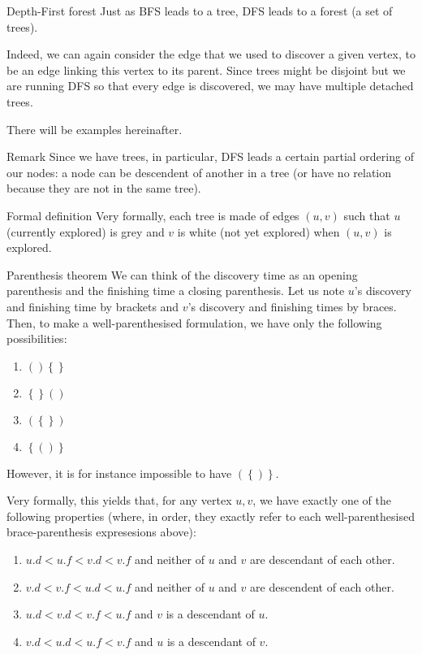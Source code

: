 \documentclass[a4paper]{article}
\begin{document}
\begin{parag}{Depth-First forest}
    Just as BFS leads to a tree, DFS leads to a forest (a set of trees). 

    Indeed, we can again consider the edge that we used to discover a given vertex, to be an edge linking this vertex to its parent. Since trees might be disjoint but we are running DFS so that every edge is discovered, we may have multiple detached trees.

    There will be examples hereinafter.

    \begin{subparag}{Remark}
        Since we have trees, in particular, DFS leads a certain partial ordering of our nodes: a node can be descendent of another in a tree (or have no relation because they are not in the same tree).
    \end{subparag}

    \begin{subparag}{Formal definition}
        Very formally, each tree is made of edges $\left(u, v\right)$ such that $u$ (currently explored) is grey and $v$ is white (not yet explored) when $\left(u, v\right)$ is explored.
    \end{subparag}
\end{parag}


\begin{parag}{Parenthesis theorem}
    We can think of the discovery time as an opening parenthesis and the finishing time a closing parenthesis. Let us note $u$'s discovery and finishing time by brackets and $v$'s discovery and finishing times by braces. Then, to make a well-parenthesised formulation, we have only the following possibilities:
    \begin{enumerate}
        \item $\left(\right)\left\{\right\}$
        \item $\left\{\right\}\left(\right)$
        \item $\left(\left\{\right\}\right)$
        \item $\left\{\left(\right)\right\}$
    \end{enumerate}
    
    However, it is for instance impossible to have $\left(\left\{\right)\right\}$.

    Very formally, this yields that, for any vertex $u, v$, we have exactly one of the following properties (where, in order, they exactly refer to each well-parenthesised brace-parenthesis expresesions above):
    \begin{enumerate}
        \item $u.d < u.f < v.d < v.f$ and neither of $u$ and $v$ are descendant of each other.
        \item $v.d < v.f < u.d < u.f$ and neither of $u$ and $v$ are descendent of each other.
        \item $u.d < v.d < v.f < u.f$ and $v$ is a descendant of $u$.
        \item $v.d < u.d < u.f < v.f$ and $u$ is a descendant of $v$.
    \end{enumerate}
\end{parag}
\end{document}
